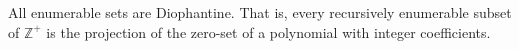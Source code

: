 All enumerable sets are Diophantine. That is, every recursively enumerable subset of $\mathbb{Z}^+$ is the projection of the zero-set of a polynomial with integer coefficients.